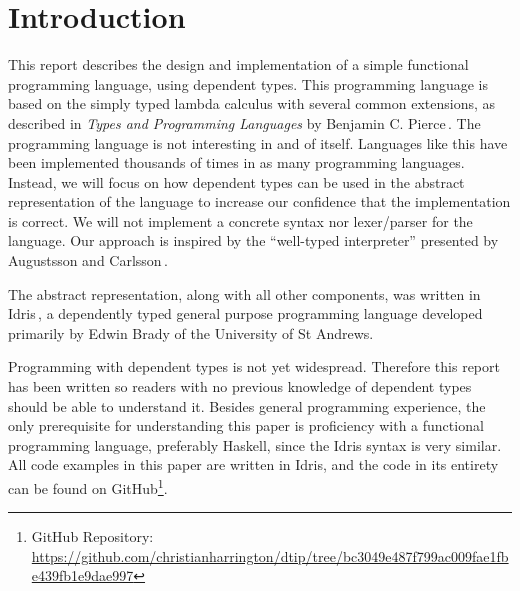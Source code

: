 \section{Introduction}
\label{sec:introduction}

This report describes the design and implementation of a simple functional programming language, using dependent types. This programming language is based on the simply typed lambda calculus with several common extensions, as described in \emph{Types and Programming Languages} by Benjamin C. Pierce\,\cite{Pierce:TypeSystems}. The programming language is not interesting in and of itself. Languages like this have been implemented thousands of times in as many programming languages. Instead, we will focus on how dependent types can be used in the abstract representation of the language to increase our confidence that the implementation is correct. We will not implement a concrete syntax nor lexer/parser for the language. Our approach is inspired by the ``well-typed interpreter'' presented by Augustsson and Carlsson\,\cite{Augustsson99anexercise}. 

The abstract representation, along with all other components, was written in Idris\,\cite{Idris}, a dependently typed general purpose programming language developed primarily by Edwin Brady of the University of St Andrews.  

Programming with dependent types is not yet widespread. Therefore this report has been written so readers with no previous knowledge of dependent types should be able to understand it. Besides general programming experience, the only prerequisite for understanding this paper is proficiency with a functional programming language, preferably Haskell, since the Idris syntax is very similar. All code examples in this paper are written in Idris, and the code in its entirety can be found on GitHub\footnote{GitHub Repository: \url{https://github.com/christianharrington/dtip/tree/bc3049e487f799ac009fae1fbe439fb1e9dae997}}.

